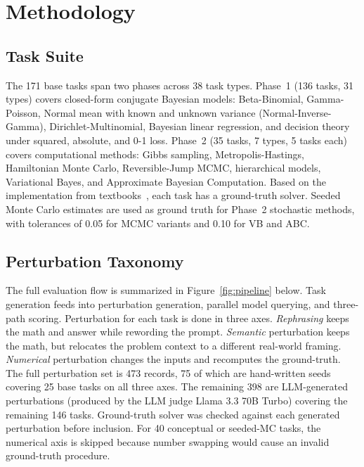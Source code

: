 
\section{Methodology}
\label{sec:methodology}

\subsection{Task Suite}

The 171 base tasks span two phases across 38 task types.
Phase~1 (136 tasks, 31 types) covers closed-form conjugate Bayesian
models: Beta-Binomial, Gamma-Poisson, Normal mean with known and
unknown variance (Normal-Inverse-Gamma), Dirichlet-Multinomial,
Bayesian linear regression, and decision theory under squared,
absolute, and 0-1 loss. Phase~2 (35 tasks, 7 types, 5 tasks each)
covers computational methods: Gibbs sampling, Metropolis-Hastings,
Hamiltonian Monte Carlo, Reversible-Jump MCMC, hierarchical models,
Variational Bayes, and Approximate Bayesian Computation. Based on
the implementation from
textbooks~\cite{bolstad2007bayesian,hoff2009bayesian,bishop2006prml},
each task has a ground-truth solver. Seeded Monte Carlo estimates
are used as ground truth for Phase~2 stochastic methods, with
tolerances of 0.05 for MCMC variants and 0.10 for VB and ABC.

\subsection{Perturbation Taxonomy}

The full evaluation flow is summarized in Figure~\ref{fig:pipeline}
below. Task generation feeds into perturbation generation, parallel
model querying, and three-path scoring. Perturbation for each task
is done in three axes. \emph{Rephrasing} keeps the math and answer
while rewording the prompt. \emph{Semantic} perturbation keeps the
math, but relocates the problem context to a different real-world
framing. \emph{Numerical} perturbation changes the inputs and recomputes the
ground-truth. The full perturbation set is 473 records, 75 of which
are hand-written seeds covering 25 base tasks on all three axes.
The remaining 398 are LLM-generated perturbations (produced by the
LLM judge Llama 3.3 70B Turbo) covering the remaining 146 tasks.
Ground-truth solver was checked against each generated perturbation
before inclusion. For 40 conceptual or seeded-MC tasks, the
numerical axis is skipped because number swapping would cause an
invalid ground-truth procedure.

